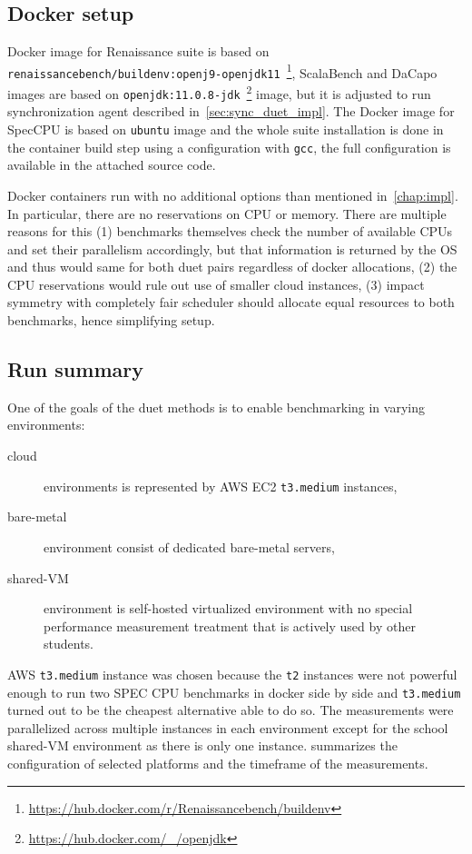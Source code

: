 \subsection{Docker setup}
Docker image for Renaissance suite is based on \lstinline{renaissancebench/buildenv:openj9-openjdk11}~\footnote{\url{https://hub.docker.com/r/Renaissancebench/buildenv}}, ScalaBench and DaCapo images are based on \lstinline{openjdk:11.0.8-jdk}~\footnote{\url{https://hub.docker.com/_/openjdk}} image, but it is adjusted to run synchronization agent described in~\cref{sec:sync_duet_impl}.
The Docker image for SpecCPU is based on \lstinline{ubuntu} image and the whole suite installation is done in the container build step using a configuration with \lstinline{gcc}, the full configuration is available in the attached source code.

Docker containers run with no additional options than mentioned in~\cref{chap:impl}.
In particular, there are no reservations on CPU or memory.
There are multiple reasons for this (1) benchmarks themselves check the number of available CPUs and set their parallelism accordingly, but that information is returned by the OS and thus would same for both duet pairs regardless of docker allocations, (2) the CPU reservations would rule out use of smaller cloud instances, (3) impact symmetry with completely fair scheduler should allocate equal resources to both benchmarks, hence simplifying setup.

\subsection{Run summary}

One of the goals of the duet methods is to enable benchmarking in varying environments:
\begin{description}
	\item[cloud] environments is represented by AWS EC2 \lstinline{t3.medium} instances,
	\item[bare-metal] environment consist of dedicated \mbox{bare-metal} servers,
	\item[shared-VM] environment is \mbox{self-hosted} virtualized environment with no special performance measurement treatment that is actively used by other students.
\end{description}
AWS \lstinline{t3.medium} instance was chosen because the \lstinline{t2} instances were not powerful enough to run two SPEC CPU benchmarks in docker side by side and \lstinline{t3.medium} turned out to be the cheapest alternative able to do so.
The measurements were parallelized across multiple instances in each environment except for the school \mbox{shared-VM} environment as there is only one instance.
 summarizes the configuration of selected platforms and the timeframe of the measurements.


